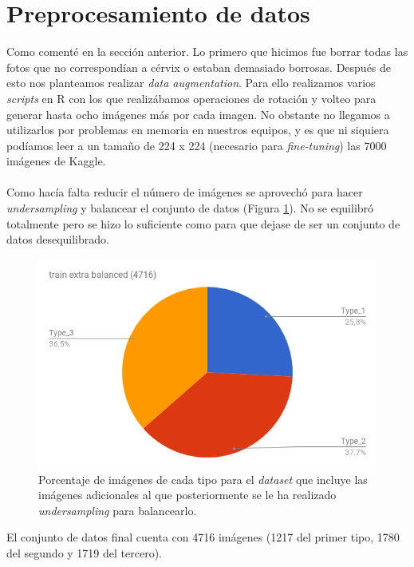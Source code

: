 \section{Preprocesamiento de datos}

Como comenté en la sección anterior. Lo primero que hicimos fue borrar todas las fotos que no correspondían a cérvix o estaban demasiado borrosas. Después de esto nos planteamos realizar \textit{data augmentation}. Para ello realizamos varios \textit{scripts} en R con los que realizábamos operaciones de rotación y volteo para generar hasta ocho imágenes más por cada imagen. No obstante no llegamos a utilizarlos por problemas en memoria en nuestros equipos, y es que ni siquiera podíamos leer a un tamaño de 224 x 224 (necesario para \textit{fine-tuning}) las 7000 imágenes de Kaggle.
\\ \\
Como hacía falta reducir el número de imágenes se aprovechó para hacer \textit{undersampling} y balancear el conjunto de datos (Figura \ref{fig:num-images-train-extra-balanced-dataset}). No se equilibró totalmente pero se hizo lo suficiente como para que dejase de ser un conjunto de datos desequilibrado.

\begin{figure}[H]
	\centering
	\includegraphics[width=12cm]{img/num-images-train-extra-balanced-dataset}
	\caption{Porcentaje de imágenes de cada tipo para el \textit{dataset} que incluye las imágenes adicionales al que posteriormente se le ha realizado \textit{undersampling} para balancearlo.}
	\label{fig:num-images-train-extra-balanced-dataset}
\end{figure}

El conjunto de datos final cuenta con 4716 imágenes (1217 del primer tipo, 1780 del segundo y 1719 del tercero).

